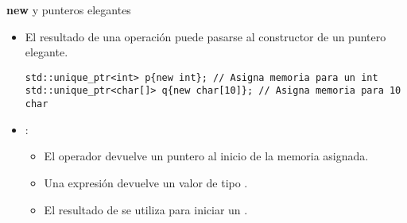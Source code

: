 \begin{frame}[t,fragile]{\textbf{new} y punteros elegantes}
\begin{itemize}
  \item El resultado de una operación  
        puede pasarse al constructor de un puntero elegante.
\begin{lstlisting}
std::unique_ptr<int> p{new int}; // Asigna memoria para un int
std::unique_ptr<char[]> q{new char[10]}; // Asigna memoria para 10 char
\end{lstlisting}

  \item {}:
    \begin{itemize}
      \item El operador  devuelve un puntero al inicio de la memoria asignada.
      \item Una expresión   devuelve un valor de tipo .
      \item El resultado de  se utiliza para iniciar un .
    \end{itemize}

\end{itemize}
\end{frame}
